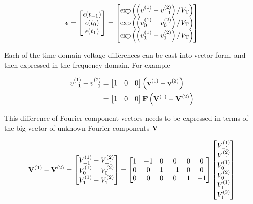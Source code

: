 \begin{equation}\label{eqn:ece1254projectReport:980}
\begin{aligned}
\Bepsilon &=
\begin{bmatrix}
\epsilon(t_{-1}) \\
\epsilon(t_{0}) \\
\epsilon(t_{1}) \\
\end{bmatrix}
=
\begin{bmatrix}
\exp\lr{ \lr{ v^{(1)}_{-1} - v^{(2)}_{-1} }/V_{\textrm{T}} } \\
\exp\lr{ \lr{ v^{(1)}_{0} - v^{(2)}_{0} }/V_{\textrm{T}} } \\
\exp\lr{ \lr{ v^{(1)}_{1} - v^{(2)}_{1} }/V_{\textrm{T}} }
\end{bmatrix} \\
\end{aligned}
\end{equation}

Each of the time domain voltage differences can be cast into vector form, and then expressed in the frequency domain.
For example

\begin{equation}\label{eqn:ece1254projectReport:1380}
\begin{aligned}
v^{(1)}_{-1} - v^{(2)}_{-1}
&=
\begin{bmatrix}
1 & 0 & 0
\end{bmatrix}
\lr{ \Bv^{(1)} - \Bv^{(2)} } \\
&=
\begin{bmatrix}
1 & 0 & 0
\end{bmatrix}
\BF
\lr{ \BV^{(1)} - \BV^{(2)} }
\end{aligned}
\end{equation}

This difference of Fourier component vectors needs to be expressed in terms of the big vector of unknown Fourier components \( \mathbf{V} \)

\begin{dmath}\label{eqn:ece1254projectReport:1000}
\BV^{(1)} - \BV^{(2)}
=
\begin{bmatrix}
V^{(1)}_{-1} - V^{(2)}_{-1} \\
V^{(1)}_{0} - V^{(2)}_{0} \\
V^{(1)}_{1} - V^{(2)}_{1} \\
\end{bmatrix}
=
\begin{bmatrix}
1 & -1 & 0 & 0 & 0 & 0 \\
0 &  0 & 1 & -1 & 0 & 0 \\
0 &  0 & 0 & 0 & 1 & -1 \\
\end{bmatrix}
\begin{bmatrix}
V_{-1}^{(1)} \\
V_{-1}^{(2)} \\
V_{0}^{(1)} \\
V_{0}^{(2)} \\
V_{1}^{(1)} \\
V_{1}^{(2)} \\
\end{bmatrix}
\end{dmath}

